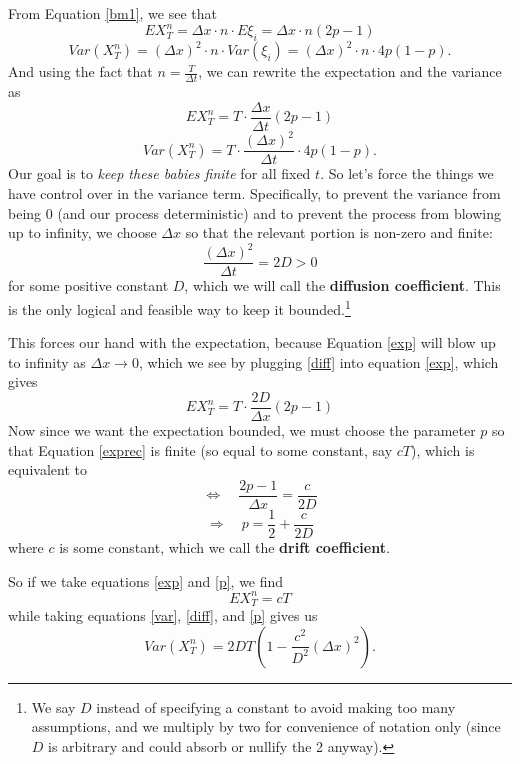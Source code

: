 \documentclass[12pt]{article}
\theoremstyle{plain}
\theoremstyle{definition}
\theoremstyle{remark}
\begin{document}
From Equation \ref{bm1}, we see that
   \[ EX^n_T  = \Delta x \cdot n \cdot E\xi_i = \Delta x \cdot n(2p-1) \]
   \[Var(X^n_T) = (\Delta x)^2 \cdot n \cdot Var(\xi_i) =
      (\Delta x)^2 \cdot n \cdot 4p(1-p). \]
And using the fact that $n = \frac{T}{\Delta t}$, we can rewrite the
expectation and the variance as
\begin{equation}
   \label{exp}
   EX^n_T = T \cdot \frac{ \Delta x}{\Delta t} (2p-1)
\end{equation}
\begin{equation}
   \label{var}
   Var(X^n_T) = T \cdot \frac{(\Delta x)^2 }{\Delta t} \cdot 4p(1-p).
\end{equation}
Our goal is to \emph{keep these babies finite} for all fixed $t$. So let's
force the things we have control over in the variance term.
Specifically, to prevent the variance from being 0 (and our process
deterministic) and to prevent the process from blowing up to infinity,
we choose $\Delta x$ so that the relevant portion is non-zero and finite:
\begin{equation}
   \label{diff}
   \frac{(\Delta x)^2}{\Delta t} = 2D > 0
\end{equation}
for some positive constant $D$, which we will call the \textbf{diffusion
coefficient}. This is the only logical and feasible way to keep it
bounded.\footnote{We say $D$ instead of specifying a constant to avoid
making too many assumptions, and we multiply by two for convenience
of notation only (since $D$ is arbitrary and could absorb or nullify
the 2 anyway).}

This forces our hand with the expectation, because Equation \ref{exp} will blow up to
infinity as $\Delta x \rightarrow 0$, which we see by plugging
\ref{diff} into equation \ref{exp}, which gives
\begin{equation}
    \label{exprec}
    EX^n_T = T \cdot \frac{ 2D}{\Delta x} (2p-1)
\end{equation}
Now since we want the expectation bounded, we must choose the parameter $p$
so that Equation \ref{exprec} is finite (so equal to some constant, say $cT$),
which is equivalent to
   \[ \Leftrightarrow \quad \frac{2p - 1}{\Delta x} = \frac{c}{2D} \]
\begin{equation}
   \label{p}
   \Rightarrow \quad p = \frac{1}{2} + \frac{c}{2D}
\end{equation}
where $c$ is some constant, which we call the \textbf{drift coefficient}.

So if we take equations \ref{exp} and \ref{p}, we find
   \[ EX^n_T = cT \]
while taking equations \ref{var}, \ref{diff}, and \ref{p} gives us
   \[ Var(X^n_T)= 2DT \left( 1 - \frac{c^2}{D^2} (\Delta x)^2 \right).\]
\end{document}
